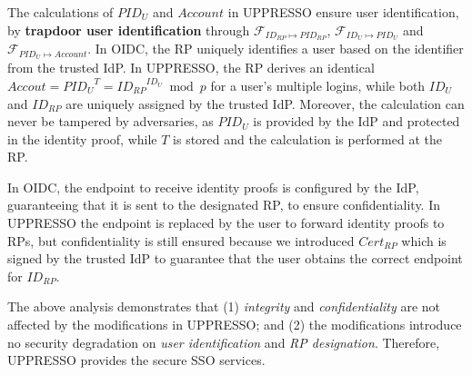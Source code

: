 The calculations of $PID_U$ and $Account$ in UPPRESSO ensure user identification,
    by \textbf{trapdoor user identification} through $\mathcal{F}_{ID_{RP} \mapsto PID_{RP}}$, $\mathcal{F}_{ID_{U} \mapsto PID_{U}}$ and $\mathcal{F}_{PID_{U} \mapsto Account}$.
In OIDC, the RP uniquely identifies a user based on the identifier from the trusted IdP.
In UPPRESSO,  the RP  derives an identical $Accout = {PID_{U}}^{T} = {ID_{RP}}^{ID_U} \bmod p$  for a user's multiple logins,
    while both $ID_U$ and $ID_{RP}$ are uniquely assigned by the trusted IdP.
%
%
%
Moreover, the calculation can never be tampered by adversaries,
  as  $PID_U$ is provided by the IdP and protected in the identity proof,
   while $T$ is stored and the calculation is performed at the RP.


In OIDC, the endpoint to receive identity proofs is configured by the IdP,
        guaranteeing that it is sent to the designated RP, to ensure confidentiality.
In UPPRESSO the endpoint is replaced by the user to forward identity proofs to RPs,
    but confidentiality is still ensured
    because we introduced $Cert_{RP}$ which is signed by the trusted IdP to guarantee that the user obtains the correct endpoint for $ID_{RP}$.



The above analysis demonstrates that (1) \emph{integrity} and \emph{confidentiality} are not affected by the modifications in UPPRESSO;
  and (2) the modifications introduce no security degradation on \emph{user identification} and \emph{RP designation}.
Therefore, UPPRESSO provides the secure SSO services.

